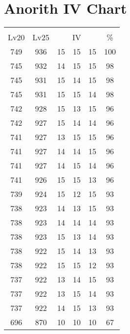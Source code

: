 \documentclass{article}%
\begin{document}
%
\normalsize%
\section{Anorith IV Chart}%
\label{sec:Anorith IV Chart}%
\renewcommand{\arraystretch}{1.5}%
\begin{tabular}{|c|c|c|c|c|c|}%
\hline%
\multicolumn{6}{|c|}{\textcolor{white}{ 
\linebreak{Anorith}
}%
\cellcolor{black}}\\%
\multicolumn{1}{|c}{Lv20}&\multicolumn{1}{c|}{Lv25}&\multicolumn{3}{c|}{IV}&\multicolumn{1}{|c|}{\%}\\%
\hline%
\rowcolor{color100}%
749&936&15&15&15&100\\%
\hline%
\rowcolor{color98}%
745&932&14&15&15&98\\%
\hline%
\rowcolor{color98}%
745&931&15&14&15&98\\%
\hline%
\rowcolor{color98}%
745&931&15&15&14&98\\%
\hline%
\rowcolor{color96}%
742&928&15&13&15&96\\%
\hline%
\rowcolor{color96}%
742&927&15&14&14&96\\%
\hline%
\rowcolor{color96}%
741&927&13&15&15&96\\%
\hline%
\rowcolor{color96}%
741&927&14&14&15&96\\%
\hline%
\rowcolor{color96}%
741&927&14&15&14&96\\%
\hline%
\rowcolor{color96}%
741&926&15&15&13&96\\%
\hline%
\rowcolor{color93}%
739&924&15&12&15&93\\%
\hline%
\rowcolor{color93}%
738&923&14&13&15&93\\%
\hline%
\rowcolor{color93}%
738&923&14&14&14&93\\%
\hline%
\rowcolor{color93}%
738&923&15&13&14&93\\%
\hline%
\rowcolor{color93}%
738&922&15&14&13&93\\%
\hline%
\rowcolor{color93}%
738&922&15&15&12&93\\%
\hline%
\rowcolor{color93}%
737&922&13&14&15&93\\%
\hline%
\rowcolor{color93}%
737&922&13&15&14&93\\%
\hline%
\rowcolor{color93}%
737&922&14&15&13&93\\%
\hline%
\rowcolor{color91}%
696&870&10&10&10&67\\%
\end{tabular}

%
\end{document}
